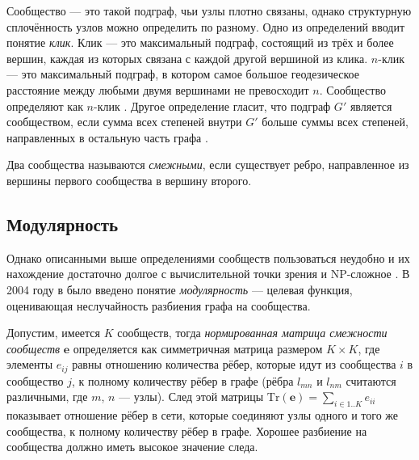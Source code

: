 Сообщество --- это такой подграф, чьи узлы плотно связаны, однако структурную сплочённость узлов можно определить по разному. Одно из определений вводит понятие \emph{клик}. Клик --- это максимальный подграф, состоящий из трёх и более вершин, каждая из которых связана с каждой другой вершиной из клика. $n$-клик --- это максимальный подграф, в котором самое большое геодезическое расстояние между любыми двумя вершинами не превосходит $n$. Сообщество определяют как $n$-клик \cite{Wasserman:1994}. Другое определение гласит, что подграф $G'$ является сообществом, если сумма всех степеней внутри $G'$ больше суммы всех степеней, направленных в остальную часть графа \cite{Wasserman:1994}.

Два сообщества называются \emph{смежными}, если существует ребро, направленное из вершины первого сообщества в вершину второго.



\subsection{Модулярность}
\label{subsec:modularity}

Однако описанными выше определениями сообществ пользоваться неудобно и их нахождение достаточно долгое с вычислительной точки зрения и NP-сложное \cite{Kvrivanek&Moravek:1986, Brucker:1978}. В 2004 году в \cite{Newman&Girvan:2004} было введено понятие \emph{модулярность} --- целевая функция, оценивающая неслучайность разбиения графа на сообщества.

Допустим, имеется $K$ сообществ, тогда \emph{нормированная матрица смежности сообществ} $\mathbf{e}$ определяется как симметричная матрица размером $K \times K$, где элементы $e_{ij}$ равны отношению количества рёбер, которые идут из сообщества $i$ в сообщество $j$, к полному количеству рёбер в графе (рёбра $l_{mn}$ и $l_{nm}$ считаются различными, где $m$, $n$ --- узлы). След этой матрицы $\mathrm{Tr} (\mathbf{e}) = \sum_{i \in 1..K}{e_{ii}}$ показывает отношение рёбер в сети, которые соединяют узлы одного и того же сообщества, к полному количеству рёбер в графе. Хорошее разбиение на сообщества должно иметь высокое значение следа.

